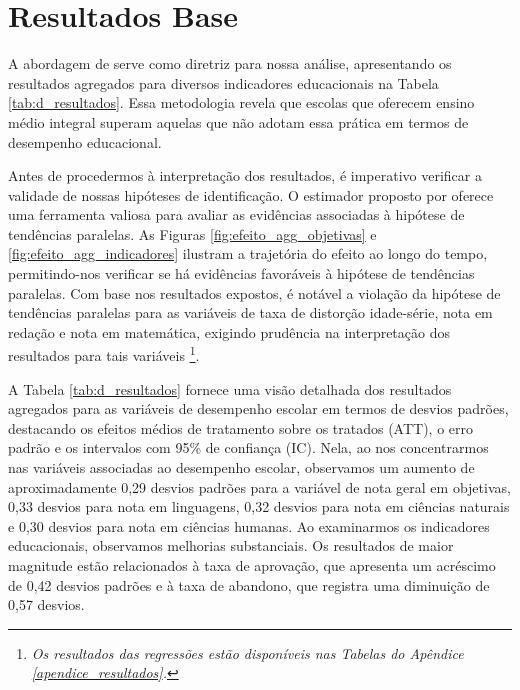 \section{Resultados Base}

A abordagem de \cite{CB_2021} serve como diretriz para nossa análise, apresentando os resultados agregados para diversos indicadores educacionais na Tabela \ref{tab:d_resultados}. Essa metodologia revela que escolas que oferecem ensino médio integral superam aquelas que não adotam essa prática em termos de desempenho educacional.

Antes de procedermos à interpretação dos resultados, é imperativo verificar a validade de nossas hipóteses de identificação. O estimador proposto por \cite{CB_2021} oferece uma ferramenta valiosa para avaliar as evidências associadas à hipótese de tendências paralelas. As Figuras \ref{fig:efeito_agg_objetivas} e \ref{fig:efeito_agg_indicadores} ilustram a trajetória do efeito ao longo do tempo, permitindo-nos verificar se há evidências favoráveis à hipótese de tendências paralelas. Com base nos resultados expostos, é notável a violação da hipótese de tendências paralelas para as variáveis de taxa de distorção idade-série, nota em redação e nota em matemática, exigindo prudência na interpretação dos resultados para tais variáveis \footnote[2]{\textit{Os resultados das regressões estão disponíveis nas Tabelas do Apêndice \ref{apendice_resultados}.}}.

A Tabela \ref{tab:d_resultados} fornece uma visão detalhada dos resultados agregados para as variáveis de desempenho escolar em termos de desvios padrões, destacando os efeitos médios de tratamento sobre os tratados (ATT), o erro padrão e os intervalos com 95\% de confiança (IC). Nela, ao nos concentrarmos nas variáveis associadas ao desempenho escolar, observamos um aumento de aproximadamente 0,29 desvios padrões para a variável de nota geral em objetivas, 0,33 desvios para nota em linguagens, 0,32 desvios para nota em ciências naturais e 0,30 desvios para nota em ciências humanas. Ao examinarmos os indicadores educacionais, observamos melhorias substanciais. Os resultados de maior magnitude estão relacionados à taxa de aprovação, que apresenta um acréscimo de 0,42 desvios padrões e à taxa de abandono, que registra uma diminuição de 0,57 desvios.

